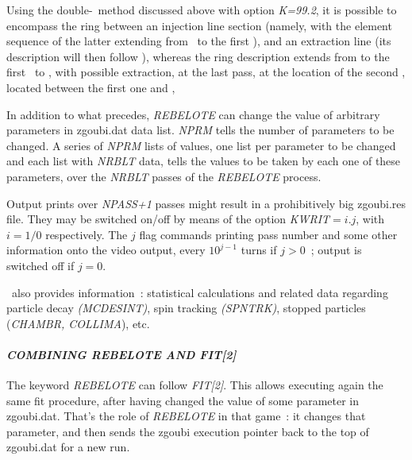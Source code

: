 \noindent Using the double-\LABEL\ method discussed above with option \textsl{K=99.2}, it is possible to encompass the ring between 
an injection line section (namely, with the element sequence of the latter extending from \OBJET\ to the first \LABEL), 
and an extraction line (its description will then follow \REBELOTE), 
whereas the ring description extends  from  to the first \LABEL\ to \REBELOTE, 
with possible extraction, at the last pass, at the location of the second \LABEL, located between the first one and \REBELOTE, 

\bigskip

In addition to what precedes,  \textsl{REBELOTE} can change the value of arbitrary parameters in zgoubi.dat 
data list. \textsl{NPRM} tells the number of parameters to be changed. 
A series of   \textsl{NPRM} lists of values, one list per parameter to be changed and each list 
with \textsl{NRBLT} data, tells the 
 values to be taken by each one of these parameters, over the \textsl{NRBLT} passes of the 
\textsl{REBELOTE} process.  

\bigskip

\noindent Output prints over \textsl{NPASS+1} passes  might result in a
prohibitively big zgoubi.res file. They may be switched on/off  by means of the option 
\mbox{\textsl{KWRIT}$= i.j$}, with $i=1/0$ respectively. The $j$ flag commands printing 
pass number and some other information onto the video output, every $10^{j-1}$ turns if $j>0$~; output is switched  
off if $j=0$. 

  
\bigskip

\noindent\REBELOTE\ also provides information~: statistical calculations and related 
data regarding particle decay \textsl{(MCDESINT)}, spin tracking  
\textsl{(SPNTRK)}, stopped particles (\textsl{CHAMBR,
 COLLIMA}), etc.  




\bigskip

\paragraph{\textit{COMBINING REBELOTE AND FIT[2]} }    %


\noindent The keyword  \textsl{REBELOTE}  can follow   \textsl{FIT[2]}.  This allows executing again 
the same fit procedure,  after having changed the value of some parameter in zgoubi.dat. 
That's the role of   \textsl{REBELOTE}  in that game~: it changes that parameter, and then sends the 
zgoubi execution pointer back to the top of zgoubi.dat for a new run. 


